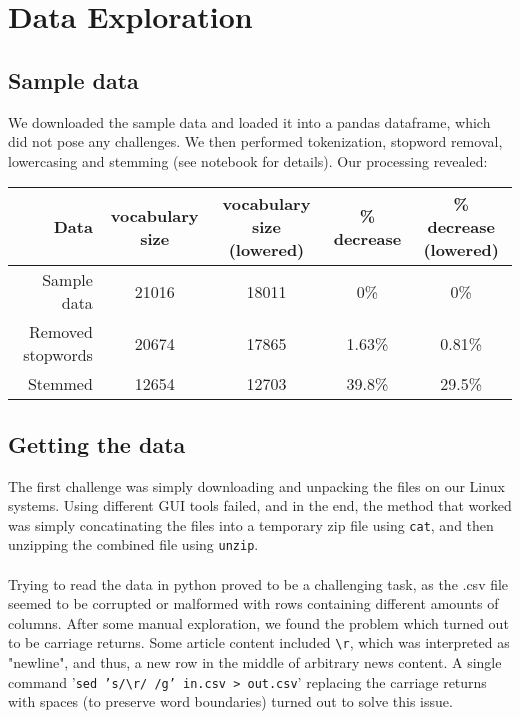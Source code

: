 \section{Data Exploration}
\subsection{Sample data}
We downloaded the sample data and loaded it into a pandas dataframe, which did not pose any challenges. 
We then performed tokenization, stopword removal, lowercasing and stemming (see notebook for details). Our processing revealed:
\begin{table}[h]
    \centering
    \begin{tabular}{r| c | c | c| c}
      Data& vocabulary size & vocabulary size (lowered) & \% decrease & \% decrease (lowered)\\
        \hline
      Sample data& 21016 & 18011 & 0\% & 0\% \\
    \hline
      Removed stopwords & 20674 & 17865 & 1.63\% & 0.81\% \\
    \hline
      Stemmed & 12654 & 12703 & 39.8\% & 29.5\%
    \end{tabular}
\end{table}

\label{sec:headings}
\subsection{Getting the data}
The first challenge was simply downloading and unpacking the files on our Linux systems. Using different GUI tools failed, and in the end, the method that worked was simply concatinating the files into a temporary zip file using \texttt{cat}, and then unzipping the combined file using \texttt{unzip}.\\
\\
Trying to read the data in python proved to be a challenging task, as the .csv file seemed to be corrupted or malformed with rows containing different amounts of columns. After some manual exploration, we found the problem which turned out to be carriage returns. Some article content included \texttt{\textbackslash r}, which was interpreted as "newline", and thus, a new row in the middle of arbitrary news content. A single command '\texttt{sed 's/\textbackslash r/ /g' in.csv > out.csv}' replacing the carriage returns with spaces (to preserve word boundaries) turned out to solve this issue.\\

